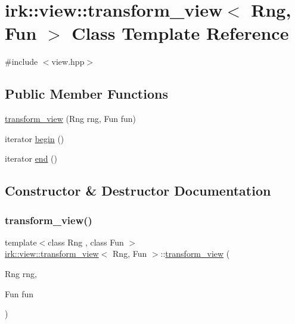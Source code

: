 \hypertarget{classirk_1_1view_1_1transform__view}{}\section{irk\+:\+:view\+:\+:transform\+\_\+view$<$ Rng, Fun $>$ Class Template Reference}
\label{classirk_1_1view_1_1transform__view}


{\ttfamily \#include $<$view.\+hpp$>$}

\subsection*{Public Member Functions}
\begin{DoxyCompactItemize}
\item 
\mbox{\hyperlink{classirk_1_1view_1_1transform__view_ab4eb20c030c385160ae24684cccae809}{transform\+\_\+view}} (Rng rng, Fun fun)
\item 
iterator \mbox{\hyperlink{classirk_1_1view_1_1transform__view_a180fe7ed3c08b3189c3693320f292e30}{begin}} ()
\item 
iterator \mbox{\hyperlink{classirk_1_1view_1_1transform__view_a3dcf8d4581ef47b812141d79b9c47de1}{end}} ()
\end{DoxyCompactItemize}


\subsection{Constructor \& Destructor Documentation}
\mbox{\label{classirk_1_1view_1_1transform__view_ab4eb20c030c385160ae24684cccae809}} 
\subsubsection{\texorpdfstring{transform\+\_\+view()}{transform\_view()}}
{\footnotesize\ttfamily template$<$class Rng , class Fun $>$ \\
\mbox{\hyperlink{classirk_1_1view_1_1transform__view}{irk\+::view\+::transform\+\_\+view}}$<$ Rng, Fun $>$\+::\mbox{\hyperlink{classirk_1_1view_1_1transform__view}{transform\+\_\+view}} (\begin{DoxyParamCaption}\item[{Rng}]{rng,  }\item[{Fun}]{fun }\end{DoxyParamCaption})\hspace{0.3cm}{\ttfamily [inline]}}



